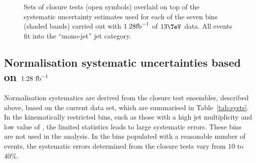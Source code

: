 \clearpage 
\begin{figure}[h!]
  \begin{center}
    \caption{Sets of closure tests (open symbols) overlaid on top of
      the systematic uncertainty estimates used for each of the seven
      \scalht bins (shaded bands) carried out with $1.28\text{fb}^{-1}$ of
      $13\tev$ data. All events fit into the ``mono-jet'' jet
      category.}
    \label{fig:closureDataMono}
  \end{center} 
\end{figure}

\clearpage
\subsection{Normalisation systematic uncertainties based on $1.28~\text{fb}^{-1}$}
\label{sec:closure-test-syst}

Normalisation systematics are derived from the closure test ensembles,
described above, based on the current data set, which are summarised
in Table~\ref{tab:systs}. In the kinematically restricted bins, such
as those with a high jet multiplicity and low value of \scalht, the
limited statistics leads to large systematic errors. These bins are
not used in the analysis. 
In the bins populated with a reasonable number of events, the
systematic errors determined from the closure tests vary from $10$ to
$40\%$.


